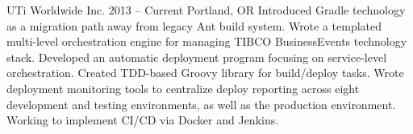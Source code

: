 {UTi Worldwide Inc.}
{2013 -- Current}
{Portland, OR}
{Introduced Gradle technology as a migration path away from legacy Ant build system. Wrote a templated multi-level orchestration engine for managing TIBCO BusinessEvents technology stack. Developed an automatic deployment program focusing on service-level orchestration. Created TDD-based Groovy library for build/deploy tasks. Wrote deployment monitoring tools to centralize deploy reporting across eight development and testing environments, as well as the production environment. Working to implement CI/CD via Docker and Jenkins.}
